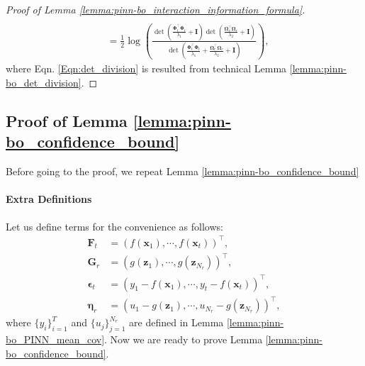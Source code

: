 \begin{proof}[Proof of Lemma \ref{lemma:pinn-bo_interaction_information_formula}]
\begin{align}
\\ 
        & = \frac{1}{2}  \log \left(\frac{\det(\frac{\boldsymbol{\Phi}_t^\top \boldsymbol{\Phi}_t}{\lambda_1} + \mathbf{I})\det(\frac{\boldsymbol{\Omega}_r^\top \boldsymbol{\Omega}_r}{\lambda_2} + \mathbf{I})}{\det(\frac{\boldsymbol{\Phi}_t^\top \boldsymbol{\Phi}_t}{\lambda_1} + \frac{\boldsymbol{\Omega}_r^\top \boldsymbol{\Omega}_r}{\lambda_2} + \mathbf{I})} \right), \nonumber
\end{align}
where Eqn. \eqref{Eqn:det_division} is resulted from technical Lemma \ref{lemma:pinn-bo_det_division}. 
\end{proof}
\subsection{Proof of Lemma \ref{lemma:pinn-bo_confidence_bound}}
Before going to the proof, we repeat Lemma \ref{lemma:pinn-bo_confidence_bound}
\PINNBOConfidenceBound*





\paragraph{Extra Definitions}
Let us define terms for the convenience as follows:
\begin{align*}
     \mathbf{F}_t & = (f(\mathbf{x}_1), \cdots, f(\mathbf{x}_t))^\top, 
     \\
      \mathbf{G}_r & = (g(\mathbf{z}_1), \cdots, g(\mathbf{z}_{N_r}))^\top, 
\\
     \boldsymbol{\epsilon}_t & = (y_1 - f(\mathbf{x}_1), \cdots, y_t - f(\mathbf{x}_t))^\top, 
\\
     \boldsymbol{\eta}_r & = (u_1 - g(\mathbf{z}_1), \cdots, u_{N_r} - g(\mathbf{z}_{N_r}))^\top,
\end{align*}
where $\{y_i\}_{i=1}^T$ and $\{u_j\}_{j=1}^{N_r}$ are defined in Lemma \ref{lemma:pinn-bo_PINN_mean_cov}. Now we are ready to prove Lemma \ref{lemma:pinn-bo_confidence_bound}.


